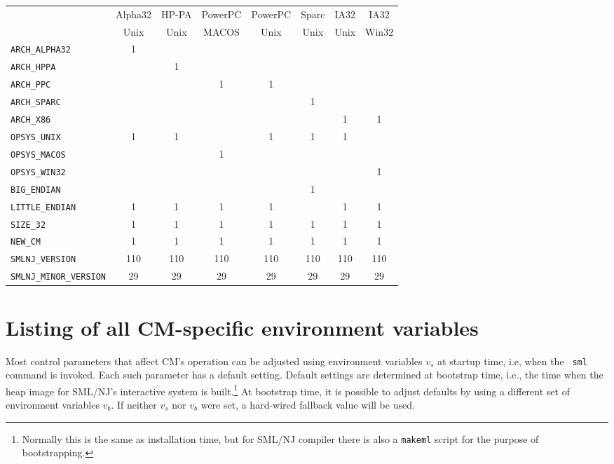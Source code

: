 \documentclass[titlepage,letterpaper]{article}
\newcommand{\smlmj}{110}
\newcommand{\smlmn}{29}
\begin{document}
\begin{center}
\begin{tabular}{l||c|c|c|c|c|c|c}
   & Alpha32 & HP-PA & PowerPC & PowerPC & Sparc & IA32 & IA32 \\
   & Unix & Unix & MACOS & Unix & Unix & Unix & Win32 \\
\hline \hline
{\tt ARCH\_ALPHA32}  & 1 & & & & & & \\
{\tt ARCH\_HPPA}     & & 1 & & & & & \\
{\tt ARCH\_PPC}      & & & 1 & 1 & & & \\
{\tt ARCH\_SPARC}    & & & & & 1 & & \\
{\tt ARCH\_X86}      & & & & & & 1 & 1 \\
{\tt OPSYS\_UNIX}    & 1 & 1 & & 1 & 1 & 1 & \\
{\tt OPSYS\_MACOS}   & & & 1 & & & & \\
{\tt OPSYS\_WIN32}   & & & & & & & 1 \\
{\tt BIG\_ENDIAN}    & & & & & 1 & & \\
{\tt LITTLE\_ENDIAN} & 1 & 1 & 1 & 1 & & 1 & 1 \\
{\tt SIZE\_32}       & 1 & 1 & 1 & 1 & 1 & 1 & 1 \\
{\tt NEW\_CM}        & 1 & 1 & 1 & 1 & 1 & 1 & 1 \\
{\tt SMLNJ\_VERSION} & \smlmj & \smlmj & \smlmj & \smlmj & \smlmj & \smlmj & \smlmj \\
{\tt SMLNJ\_MINOR\_VERSION} & \smlmn & \smlmn & \smlmn & \smlmn & \smlmn & \smlmn & \smlmn
\end{tabular}
\end{center}

\section{Listing of all CM-specific environment variables}

Most control parameters that affect CM's operation can be adjusted
using environment variables $v_s$ at startup time, i.e, when the {\tt
sml} command is invoked.  Each such parameter has a default setting.
Default settings are determined at bootstrap time, i.e., the time when
the heap image for SML/NJ's interactive system is
built.\footnote{Normally this is the same as installation time, but
for SML/NJ compiler there is also a {\tt makeml} script for the
purpose of bootstrapping.}  At bootstrap time, it is possible to
adjust defaults by using a different set of environment variables
$v_b$.  If neither $v_s$ nor $v_b$ were set, a hard-wired fallback
value will be used.
\end{document}
